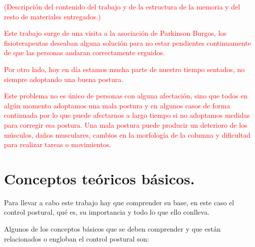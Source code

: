 \textcolor{red}{(Descripción del contenido del trabajo y de la estructura de la memoria y del resto de materiales entregados.)}

\textcolor{red}{Este trabajo surge de una visita a la asociación de Parkinson Burgos, los fisioterapeutas deseaban alguna solución para no estar pendientes continuamente de que las personas andaran correctamente erguidos. }

\textcolor{red}{Por otro lado, hoy en día estamos mucha parte de nuestro tiempo sentados, no siempre adoptando una buena postura.}

\textcolor{red}{Este problema no es único de personas con alguna afectación, sino que todos en algún momento adoptamos una mala postura y en algunos casos de forma continuada por lo que puede afectarnos a largo tiempo si no adoptamos medidas para corregir esa postura. Una mala postura puede producir un deterioro de los músculos, daños musculares, cambios en la morfología de la columna y dificultad para realizar tareas o movimientos.}

\section{Conceptos teóricos básicos.} %
Para llevar a cabo este trabajo hay que comprender su base, en este caso el control postural, qué es, su importancia y todo lo que ello conlleva.\cite{Libro1,Libro2} %



Algunos de los conceptos básicos que se deben comprender y que están relacionados o engloban el control postural son:

